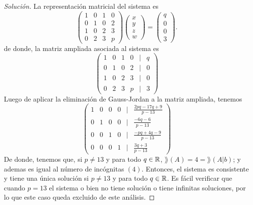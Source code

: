 \documentclass[a4,11pt]{aleph-notas}
\begin{document}
\begin{proof}[Solución]\hspace{0pt}
    La representación matricial del sistema es
    \[
    \begin{pmatrix}
                1&0&1&0\\0&1&0&2\\1&0&2&3\\0&2&3&p
                \end{pmatrix}
                \begin{pmatrix}
                x \\ y\\ z \\ w
                \end{pmatrix}
                =
                \begin{pmatrix}
                q \\ 0\\ 0\\ 3
                \end{pmatrix}.
    \]
    de donde, la matriz ampliada asociada al sistema es
    \[
                \begin{pmatrix}
                1&0&1&0&|&q\\
                0&1&0&2&|& 0\\
                1&0&2&3&|& 0\\
                0&2&3&p&|& 3
                \end{pmatrix} 
    \]
    Luego de aplicar la eliminación de Gauss-Jordan a la matriz ampliada, tenemos 
    \[
                \begin{pmatrix}
                1&0&0&0&|&\frac{2pq-17q+9}{p-13}\\
                0&1&0&0&|& \frac{-6q-6}{p-13}\\
                0&0&1&0&|& \frac{-pq+4q-9}{p-13}\\
                0&0&0&1&|& \frac{3q+3}{p-13}
                \end{pmatrix} 
    \]
    De donde, tenemos que, si $p \neq 13$ y para todo $q \in \mathbb{R}$, $\rang(A)=4 = \rang(A|b)$; y ademas es igual al número de incógnitas $(4)$. Entonces, el sistema es consistente y tiene una única solución si $p \neq 13$ y para todo $q \in \mathbb{R}$. Es fácil verificar que cuando $p=13$ el sistema o bien no tiene solución o tiene infinitas soluciones, por lo que este caso queda excluido de este análisis.
\end{proof}
\end{document}
